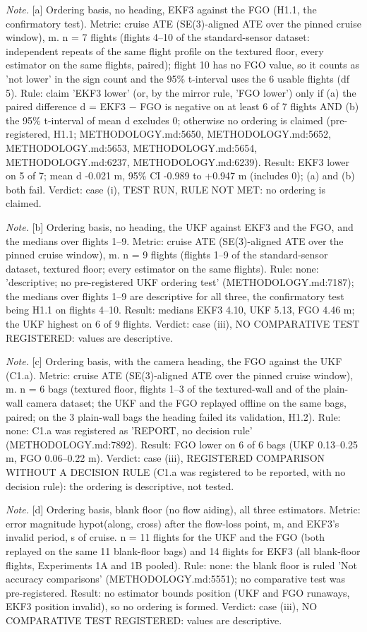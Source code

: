 \begin{table}[htbp]
\textit{Note.} [a] Ordering basis, no heading, EKF3 against the FGO (H1.1, the confirmatory test). Metric: cruise ATE (SE(3)-aligned ATE over the pinned cruise window), m. n = 7 flights (flights 4--10 of the standard-sensor dataset: independent repeats of the same flight profile on the textured floor, every estimator on the same flights, paired); flight 10 has no FGO value, so it counts as 'not lower' in the sign count and the 95\% t-interval uses the 6 usable flights (df 5). Rule: claim 'EKF3 lower' (or, by the mirror rule, 'FGO lower') only if (a) the paired difference d = EKF3 $-$ FGO is negative on at least 6 of 7 flights AND (b) the 95\% t-interval of mean d excludes 0; otherwise no ordering is claimed (pre-registered, H1.1; METHODOLOGY.md:5650, METHODOLOGY.md:5652, METHODOLOGY.md:5653, METHODOLOGY.md:5654, METHODOLOGY.md:6237, METHODOLOGY.md:6239). Result: EKF3 lower on 5 of 7; mean d -0.021 m, 95\% CI -0.989 to +0.947 m (includes 0); (a) and (b) both fail. Verdict: case (i), TEST RUN, RULE NOT MET: no ordering is claimed.\par
\textit{Note.} [b] Ordering basis, no heading, the UKF against EKF3 and the FGO, and the medians over flights 1--9. Metric: cruise ATE (SE(3)-aligned ATE over the pinned cruise window), m. n = 9 flights (flights 1--9 of the standard-sensor dataset, textured floor; every estimator on the same flights). Rule: none: 'descriptive; no pre-registered UKF ordering test' (METHODOLOGY.md:7187); the medians over flights 1--9 are descriptive for all three, the confirmatory test being H1.1 on flights 4--10. Result: medians EKF3 4.10, UKF 5.13, FGO 4.46 m; the UKF highest on 6 of 9 flights. Verdict: case (iii), NO COMPARATIVE TEST REGISTERED: values are descriptive.\par
\textit{Note.} [c] Ordering basis, with the camera heading, the FGO against the UKF (C1.a). Metric: cruise ATE (SE(3)-aligned ATE over the pinned cruise window), m. n = 6 bags (textured floor, flights 1--3 of the textured-wall and of the plain-wall camera dataset; the UKF and the FGO replayed offline on the same bags, paired; on the 3 plain-wall bags the heading failed its validation, H1.2). Rule: none: C1.a was registered as 'REPORT, no decision rule' (METHODOLOGY.md:7892). Result: FGO lower on 6 of 6 bags (UKF 0.13--0.25 m, FGO 0.06--0.22 m). Verdict: case (iii), REGISTERED COMPARISON WITHOUT A DECISION RULE (C1.a was registered to be reported, with no decision rule): the ordering is descriptive, not tested.\par
\textit{Note.} [d] Ordering basis, blank floor (no flow aiding), all three estimators. Metric: error magnitude hypot(along, cross) after the flow-loss point, m, and EKF3's invalid period, s of cruise. n = 11 flights for the UKF and the FGO (both replayed on the same 11 blank-floor bags) and 14 flights for EKF3 (all blank-floor flights, Experiments 1A and 1B pooled). Rule: none: the blank floor is ruled 'Not accuracy comparisons' (METHODOLOGY.md:5551); no comparative test was pre-registered. Result: no estimator bounds position (UKF and FGO runaways, EKF3 position invalid), so no ordering is formed. Verdict: case (iii), NO COMPARATIVE TEST REGISTERED: values are descriptive.\par

\end{table}
